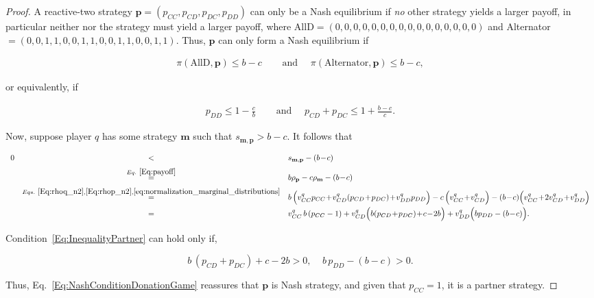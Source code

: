 \documentclass{article}
\theoremstyle{definition}
\begin{document}
\begin{proof}
A reactive-two strategy \(\mathbf{p} = (p_{CC}, p_{CD}, p_{DC}, p_{DD})\) can only
be a Nash equilibrium if {\it no} other strategy yields a larger payoff, in
particular neither  nor the  strategy must yield a
larger payoff, where AllD\(=(0, 0, 0, 0, 0, 0, 0, 0, 0, 0, 0, 0, 0, 0, 0, 0)\)
and Alternator\(=(0, 0, 1, 1, 0, 0, 1, 1, 0, 0, 1, 1, 0, 0, 1, 1)\). Thus,
\(\mathbf{p}\) can only form a Nash equilibrium if 

\begin{align*}
\pi(\text{AllD}, \mathbf{p}) \leq b\!-\!c & \quad \text{ and } \quad \pi(\text{Alternator}, \mathbf{p}) \leq b\!-\!c,
\end{align*}

or equivalently, if

\begin{align}\label{Eq:NashConditionDonationGame}
  p_{DD} \leq 1 - \frac{c}{b} & \quad \text{ and } \quad  p_{CD} + p_{DC} \leq 1 + \frac{b\!-\!c}{c}.
\end{align}

Now, suppose player $q$ has some strategy $\mathbf{m}$ such that $s_{\mathbf{m},
\mathbf{p}} > b\!-\!c$. It follows that

\begin{equation} \label{Eq:InequalityPartner}
\begin{array}{rcl}
0 	& <	&s_{\mathbf{m}, \mathbf{p}}-(b\!-\!c)\\[0.2cm]
	&\stackrel{Eq.~\eqref{Eq:payoff}}{=}	&b\rho_\mathbf{p} - c\rho_\mathbf{m}-(b\!-\!c)\\[0.2cm]
	&\stackrel{Eqs.~\eqref{Eq:rhoq_n2}, \eqref{Eq:rhop_n2}, \eqref{eq:normalization_marginal_distributions}}{=}	&b\,\Big( v^q_{CC} p_{CC} \!+\!  v^q_{CD}(p_{CD}\!+\!p_{DC}) \!+\! v^q_{DD} p_{DD}\Big) 
		- c\,\Big(v^q_{CC} \!+\! v^q_{CD}\Big) - (b\!-\!c)\Big(v^q_{CC} \!+\!  2v^q_{CD} \!+\! v^q_{DD}\Big)\\[0.2cm]
	&=	&v^q_{CC} \,b\,(p_{CC}-1) + v^q_{CD}\Big(b(p_{CD}\!+\!p_{DC})\!+\!c\!-\!2b\Big) + v^q_{DD}\Big(bp_{DD}-(b\!-\!c)\Big).
\end{array}
\end{equation}

Condition~\eqref{Eq:InequalityPartner} can hold only if,

\begin{equation}
  b \, (p_{CD}\!+\!p_{DC})\!+\!c\!-\!2b > 0,~~~~~ b\, p_{DD} - (b\!-\!c) > 0.
\end{equation}

Thus, Eq.~\eqref{Eq:NashConditionDonationGame} reassures that $\mathbf{p}$
is Nash strategy, and given that $p_{CC} = 1$, it is a partner strategy.

\end{proof}
\end{document}
